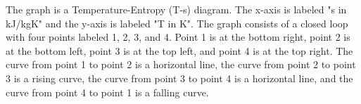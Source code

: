 The graph is a Temperature-Entropy (T-s) diagram. The x-axis is labeled "s in kJ/kgK" and the y-axis is labeled "T in K". The graph consists of a closed loop with four points labeled 1, 2, 3, and 4. Point 1 is at the bottom right, point 2 is at the bottom left, point 3 is at the top left, and point 4 is at the top right. The curve from point 1 to point 2 is a horizontal line, the curve from point 2 to point 3 is a rising curve, the curve from point 3 to point 4 is a horizontal line, and the curve from point 4 to point 1 is a falling curve.